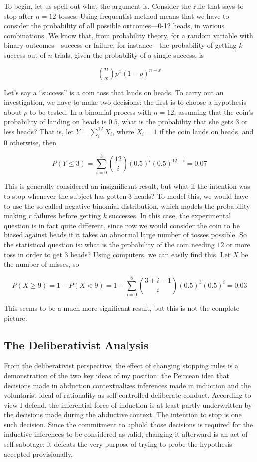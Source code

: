 To begin, let us spell out what the argument is. Consider the rule that says to stop after \(n=12\) tosses. Using frequentist method means that we have to consider the probability of all
possible outcomes---0-12 heads, in various combinations.  We know that, from probability theory, for a random
variable with binary outcomes---success or failure, for instance---the
probability of getting \(k\) success out of \(n\) trials, given the
probability of a single success, is

\[{n \choose x} p^x (1-p)^{n-x}\]

Let's say a ``success'' is a coin toss that lands on heads. To carry out
an investigation, we have to make two decisions: the first is to choose
a hypothesis about \(p\) to be tested. In a binomial process with
\(n=12\), assuming that the coin's probability of landing on heads is
\(0.5\), what is the probability that she gets 3 or less heads? That is,
let \(Y=\sum_i^{12} X_i\), where \(X_i = 1\) if the coin lands on heads,
and 0 otherwise, then

\[P(Y \leq 3 ) =  \sum_{i=0}^{3} {12 \choose i} (0.5)^i (0.5)^{12-i} = 0.07\]

This is generally considered an insignificant result, but what if the
intention was to stop whenever the subject has gotten 3 heads? To model
this, we would have to use the so-called negative binomial distribution,
which models the probability making \(r\) failures before getting \(k\)
successes. In this case, the experimental question is in fact quite
different, since now we would consider the coin to be biased against
heads if it takes an abnormal large number of tosses possible. So the
statistical question is: what is the probability of the coin needing
\(12\) or more toss in order to get 3 heads? Using computers, we can
easily find this. Let \(X\) be the number of misses, so

\[P(X \geq 9) = 1 - P(X <9) = 1 - \sum_{i=0}^{8} {3+i-1 \choose i} (0.5)^3 (0.5)^{i} =0.03\]

This seems to be a much more significant result, but this is not the
complete picture. 

\subsection{The Deliberativist Analysis}

From the deliberativist perspective, the effect of changing stopping rules is a demonstration of the two key ideas of my position: the Peircean idea that decisions made in abduction contextualizes inferences made in induction and the voluntarist ideal of rationality as self-controlled deliberate conduct. According to view I defend, the inferential force of induction is at least partly underwritten by the decisions made during the abductive context. The intention to stop is one such decision. Since the commitment to uphold those decisions is required for the inductive inferences to be considered as valid, changing it afterward is an act of self-sabotage: it defeats the very purpose of trying to probe the hypothesis accepted provisionally. 


